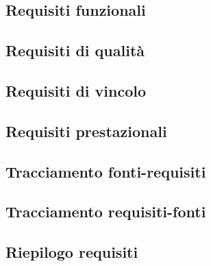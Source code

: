 \subsection{Requisiti funzionali}
\subsection{Requisiti di qualità}
\subsection{Requisiti di vincolo}
\subsection{Requisiti prestazionali}
\subsection{Tracciamento fonti-requisiti}
\subsection{Tracciamento requisiti-fonti}
\subsection{Riepilogo requisiti}